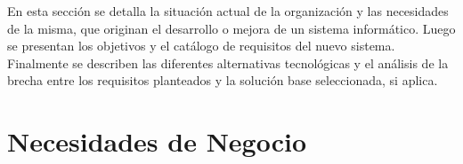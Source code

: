 

En esta sección se detalla la situación actual de la organización y las necesidades de la misma, que originan el desarrollo o mejora de un sistema informático. Luego se presentan los objetivos y el catálogo de requisitos del nuevo sistema. Finalmente se describen las diferentes alternativas tecnológicas y el análisis de la brecha entre los requisitos planteados y la solución base seleccionada, si aplica.





\section{Necesidades de Negocio}

